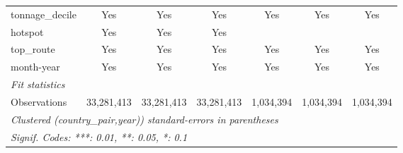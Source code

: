 \begin{tabular}{lcccccc}
   tonnage\_decile      & Yes            & Yes             & Yes             & Yes            & Yes             & Yes\\  
   hotspot              & Yes            & Yes             & Yes             &                &                 & \\  
   top\_route           & Yes            & Yes             & Yes             & Yes            & Yes             & Yes\\  
   month-year           & Yes            & Yes             & Yes             & Yes            & Yes             & Yes\\  
   \midrule
   \emph{Fit statistics}\\
   Observations         & 33,281,413     & 33,281,413      & 33,281,413      & 1,034,394      & 1,034,394       & 1,034,394\\  
   \midrule \midrule
   \multicolumn{7}{l}{\emph{Clustered (country\_pair,year)) standard-errors in parentheses}}\\
   \multicolumn{7}{l}{\emph{Signif. Codes: ***: 0.01, **: 0.05, *: 0.1}}\\
\end{tabular}
\par\endgroup
